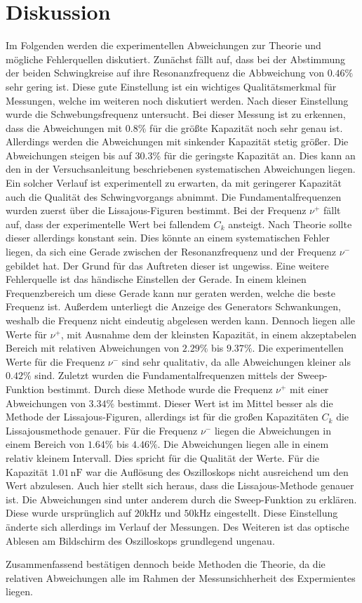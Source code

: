 \section{Diskussion}
\label{sec:Diskussion}
Im Folgenden werden die experimentellen Abweichungen zur Theorie und mögliche Fehlerquellen diskutiert.
Zunächst fällt auf, dass bei der Abstimmung der beiden Schwingkreise auf ihre Resonanzfrequenz die Abbweichung von $0.46\%$ sehr gering ist. Diese gute Einstellung ist ein wichtiges Qualitätsmerkmal
für Messungen, welche im weiteren noch diskutiert werden. Nach dieser Einstellung wurde die Schwebungsfrequenz untersucht. Bei dieser Messung ist zu erkennen, dass die Abweichungen mit $0.8\%$ für
die größte Kapazität noch sehr genau ist. Allerdings werden die Abweichungen mit sinkender Kapazität stetig größer. Die Abweichungen steigen bis auf $30.3\%$ für die geringste Kapazität an. Dies 
kann an den in der Versuchsanleitung \cite{v355} beschriebenen systematischen Abweichungen liegen. Ein solcher Verlauf ist experimentell zu erwarten, da mit geringerer Kapazität 
auch die Qualität des Schwingvorgangs abnimmt. Die Fundamentalfrequenzen wurden zuerst über die Lissajous-Figuren bestimmt. Bei der Frequenz $\nu^+$ fällt auf, dass der experimentelle Wert
bei fallendem $C_k$ ansteigt. Nach Theorie sollte dieser allerdings konstant sein. Dies könnte an einem systematischen Fehler liegen, da sich eine Gerade zwischen der Resonanzfrequenz und der Frequenz
$\nu^-$ gebildet hat. Der Grund für das Auftreten dieser ist ungewiss. Eine weitere Fehlerquelle ist das händische Einstellen der Gerade. In einem kleinen Frequenzbereich um diese Gerade kann nur geraten werden, 
welche die beste Frequenz ist. Außerdem unterliegt die Anzeige des Generators Schwankungen, weshalb die Frequenz nicht eindeutig abgelesen werden kann. Dennoch liegen alle Werte
für $\nu^+$, mit Ausnahme dem der kleinsten Kapazität, in einem akzeptabelen Bereich mit relativen Abweichungen von $2.29\%$ bis $9.37\%$. Die experimentellen Werte für die Frequenz $\nu^-$ sind sehr 
qualitativ, da alle Abweichungen kleiner als $0.42\%$ sind. Zuletzt wurden die Fundamentalfrequenzen mittels der Sweep-Funktion bestimmt. Durch diese Methode wurde die Frequenz $\nu^+$ mit einer 
Abweichungen von $3.34\%$ bestimmt. Dieser Wert ist im Mittel besser als die Methode der Lissajous-Figuren, allerdings ist für die großen Kapazitäten
$C_k$ die Lissajousmethode genauer. Für die Frequenz $\nu^-$ liegen die Abweichungen in einem Bereich von $1.64\%$ bis $4.46\%$. Die Abweichungen liegen alle in einem relativ kleinem Intervall. 
Dies spricht für die Qualität der Werte. Für die Kapazität $1.01\, \unit{\nano\farad}$ war die Auflösung des Oszilloskops nicht ausreichend um den Wert abzulesen. Auch hier stellt sich heraus, 
dass die Lissajous-Methode 
genauer ist. Die Abweichungen sind unter anderem durch die Sweep-Funktion zu erklären. Diese wurde ursprünglich auf $20 \unit{\kilo\hertz}$ und $50 \unit{\kilo\hertz}$ eingestellt. 
Diese Einstellung änderte sich allerdings im Verlauf der Messungen. Des Weiteren ist das optische Ablesen am Bildschirm des Oszilloskops grundlegend ungenau.


Zusammenfassend bestätigen dennoch beide Methoden die Theorie, da die relativen Abweichungen alle im Rahmen der Messunsichherheit des Expermientes liegen.
